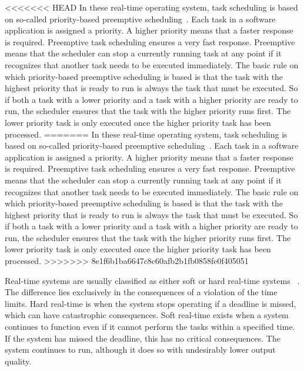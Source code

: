 \documentclass[MMR,Master,english]{twbook}
\begin{document}
<<<<<<< HEAD
\noindent In these real-time operating system, task scheduling is based on so-called priority-based preemptive scheduling~\cite{buttazzoHardRealtimeComputing2024}. Each task in a software application is assigned a priority. A higher priority means that a faster response is required. Preemptive task scheduling ensures a very fast response. Preemptive means that the scheduler can stop a currently running task at any point if it recognizes that another task needs to be executed immediately. The basic rule on which priority-based preemptive scheduling is based is that the task with the highest priority that is ready to run is always the task that must be executed. So if both a task with a lower priority and a task with a higher priority are ready to run, the scheduler ensures that the task with the higher priority runs first. The lower priority task is only executed once the higher priority task has been processed. 
=======
\noindent In these real-time operating system, task scheduling is based on so-called priority-based preemptive scheduling~\cite{buttazzoHardRealtimeComputing2024}. Each task in a software application is assigned a priority. A higher priority means that a faster response is required. Preemptive task scheduling ensures a very fast response. Preemptive means that the scheduler can stop a currently running task at any point if it recognizes that another task needs to be executed immediately. The basic rule on which priority-based preemptive scheduling is based is that the task with the highest priority that is ready to run is always the task that must be executed. So if both a task with a lower priority and a task with a higher priority are ready to run, the scheduler ensures that the task with the higher priority runs first. The lower priority task is only executed once the higher priority task has been processed.
>>>>>>> 8e1f6b1ba6647c8c60afb2b1fb0858fe0f405051

\bigskip \noindent Real-time systems are usually classified as either soft or hard real-time systems ~\cite{lipariRealTimeSchedulingHard}. The difference lies exclusively in the consequences of a violation of the time limits. Hard real-time is when the system stops operating if a deadline is missed, which can have catastrophic consequences. Soft real-time exists when a system continues to function even if it cannot perform the tasks within a specified time. If the system has missed the deadline, this has no critical consequences. The system continues to run, although it does so with undesirably lower output quality.
\end{document}
